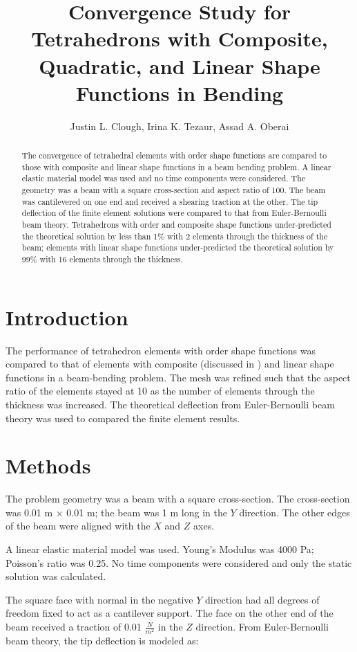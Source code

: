 \documentclass[a4paper, 12pt]{article}
\author{Justin L. Clough, 
        Irina K. Tezaur,
        Assad A. Oberai}
\title{Convergence Study for Tetrahedrons with Composite, Quadratic, and Linear Shape Functions in Bending}
\begin{document}
\maketitle

\begin{abstract}
The convergence of tetrahedral elements with
 order shape functions are compared to those with composite
and linear shape functions
in a beam bending problem.
A linear elastic material model was used
and no time components were considered.
The geometry was a beam with a square cross-section and 
aspect ratio of 100.
The beam was cantilevered on one end and received a 
shearing traction at the other. 
The tip deflection of the finite element solutions were
compared to that from Euler-Bernoulli beam theory. 
Tetrahedrons with  order and composite shape functions under-predicted
the theoretical solution by less than 1\% with 2 elements 
through the thickness of the beam;
elements with linear shape functions under-predicted 
the theoretical solution by 99\% with 16 elements through the thickness.
\end{abstract}

\section{Introduction}
The performance of tetrahedron elements with  order shape functions
was compared to that of elements with composite
(discussed in \cite{bib:composite_tet})
and linear shape functions in a beam-bending problem.
The mesh was refined such that the aspect ratio of the elements
stayed at 10 as the number of elements through the thickness was increased.
The theoretical deflection from Euler-Bernoulli beam theory was used to
compared the finite element results.

\section{Methods}
The problem geometry was a beam with a square cross-section.
The cross-section was 0.01 m $ \times $ 0.01 m; 
the beam was 1 m long in the $Y$ direction.
The other edges of the beam were aligned with the $X$ and $Z$ axes.

A linear elastic material model was used. 
Young's Modulus was 4000 Pa;
Poisson's ratio was 0.25.
No time components were considered
and only the static solution was calculated.

The square face with normal in the negative $Y$ direction had 
all degrees of freedom fixed to act as a cantilever support. 
The face on the other end of the beam received a 
traction of 0.01 $\frac{N}{m^2}$ in the $Z$ direction.
From Euler-Bernoulli beam theory, the tip deflection
is modeled as:
\end{document}
